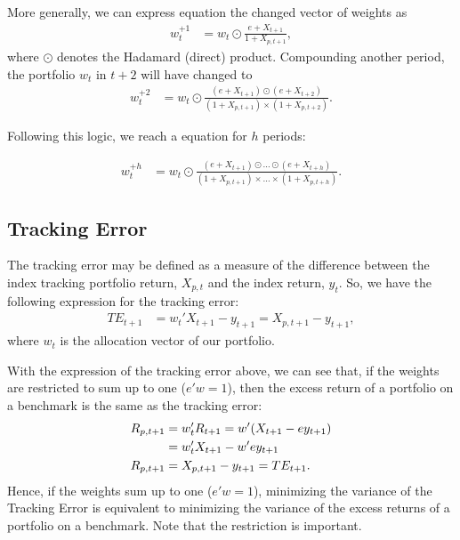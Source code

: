 \documentclass[preprint, doubleblind, authoryear,10pt]{elsarticle}
\begin{document}
More generally, we can express equation the changed vector of weights as
\begin{align}
	\label{eq:wplus1}
	w_{t}^{+1} &= w_{t} \odot \frac{e + X_{t+1}}{1 + X_{p,t+1}},
\end{align}
where $\odot$ denotes the Hadamard (direct) product.
Compounding another period, the portfolio $w_{t}$ in $t+2$ will have changed to
\begin{align*}
	w_{t}^{+2} &= w_{t} \odot 
	\frac{(e + X_{t+1})\odot(e + X_{t+2})}{(1 + X_{p,t+1})\times(1 + X_{p,t+2})}.
\end{align*}

Following this logic, we reach a equation for $h$ periods:

\begin{align}
	\label{eq:wplush}
	w_{t}^{+h} &= w_{t} \odot 
	\frac{(e + X_{t+1})\odot\dots\odot(e + X_{t+h})}
	{(1 + X_{p,t+1})\times \dots \times(1 + X_{p,t+h})}.
\end{align}

\subsection*{Tracking Error}

The tracking error may be defined as a measure of the difference between the index tracking portfolio return, $X_{p,t}$ and the index return, $y_{t}$.
So, we have the following expression for the tracking error:
\begin{align} 
	\label{eq:TE}
	TE_{t+1} &= w_{t}'X_{t+1} - y_{t+1} 
	= X_{p, t+1} - y_{t+1},
\end{align}
where $w_{t}$ is the allocation vector of our portfolio.

With the expression of the tracking error above, we can see that, if the weights are restricted to sum up to one ($e'w=1$), then the excess return of a portfolio on a benchmark is the same as the tracking error:
\begin{align}
	\notag
	R_{p,t+1} & = w_{t}'R_{t+1} = w'(X_{t+1} - e y_{t+1})
	\\
	\notag
	& = w_{t}'X_{t+1} - w'e y_{t+1}
	\\
	\label{eq:TER}
	R_{p,t+1} & = X_{p,t+1} - y_{t+1} = TE_{t+1}.
\end{align}
Hence, if the weights sum up to one ($e'w=1$), minimizing the variance of the Tracking Error is equivalent to minimizing the variance of the excess returns of a portfolio on a benchmark.
Note that the restriction is important.
\end{document}
